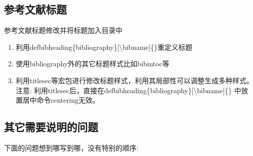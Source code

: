\subsection{参考文献标题}
  参考文献标题修改并将标题加入目录中
  \begin{enumerate}
    \item 利用defbibheading\{bibliography\}[\textbackslash bibname]\{\}重定义标题
    \item 使用bibliography外的其它标题样式比如bibintoc等
    \item 利用titlesec等宏包进行修改标题样式，利用其局部性可以调整生成多种样式。注意: 利用titlesec后，直接在defbibheading\{bibliography\}[\textbackslash bibname]\{\} 中放置居中命令centering无效。
  \end{enumerate}


\subsection{其它需要说明的问题}
下面的问题想到哪写到哪，没有特别的顺序:


